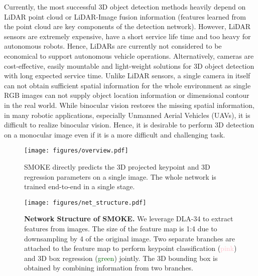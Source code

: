 \documentclass[10pt,twocolumn,letterpaper]{article}
\begin{document}
    Currently, the most successful 3D object detection methods heavily depend on LiDAR point cloud \cite{voxelnet_2018, pointrcnn_2019, std_2019} or LiDAR-Image fusion information \cite{mmf_2019, frustum_2019, MV3D_2017} (features learned from the point cloud are key components of the detection network). However, LiDAR sensors are extremely expensive, have a short service life time and too heavy for autonomous robots. Hence, LiDARs are currently not considered to be economical to support autonomous vehicle operations. Alternatively, cameras are cost-effective, easily mountable and light-weight solutions for 3D object detection with long expected service time. 
    Unlike LiDAR sensors, a single camera in itself can not obtain sufficient spatial information for the whole environment as single RGB images can not supply object location information or dimensional contour in the real world. While binocular vision restores the missing spatial information, in many robotic applications, especially Unmanned Aerial Vehicles (UAVs), it is difficult to realize binocular vision.
    Hence, it is desirable to perform 3D detection on a monocular image even if it is a more difficult and challenging task.
    
    \begin{figure}[t]
    \centering
\texttt{[image: figures/overview.pdf]}
       \caption{SMOKE directly predicts the 3D projected keypoint and 3D regression parameters on a single image. The whole network is trained end-to-end in a single stage.}
    \label{fig:overview}\vspace{-6mm}
    \end{figure}
    
    \begin{figure*}[t]
    \centering
    \vspace{-4em}
    \texttt{[image: figures/net\_structure.pdf]}
    \vspace{-4em}
    \caption{\textbf{Network Structure of SMOKE.} We leverage DLA-34 \cite{dla_2018} to extract features from images. The size of the feature map is 1:4 due to  downsampling by 4 of the original image. Two separate branches are attached to the feature map to perform keypoint classification (\textcolor{pink}{pink}) and 3D box regression (\textcolor{darkgreen}{green}) jointly. The 3D bounding box is obtained by combining information from two branches.}
    \label{net_structure} \vspace{-6mm}
    \end{figure*}
    
\end{document}
